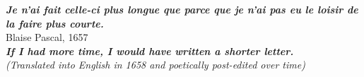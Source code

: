 \thispagestyle{empty}
\hbox{} \vfill
\begin{flushright}
    \textit{\textbf{Je n'ai fait celle-ci plus longue que parce que je n'ai pas eu le loisir de la faire plus courte.}}
    \\ \vspace{2.5mm} \small Blaise Pascal, 1657
    \\ \vspace{5mm} \small {\color{gray} \textit{\textbf{If I had more time, I would have written a shorter letter.}}}
    \\ \vspace{2mm} \small {\color{gray} \textit{(Translated into English in 1658 and poetically post-edited over time)}}
\end{flushright}

\clearpage
\thispagestyle{empty}
\cleardoublepage